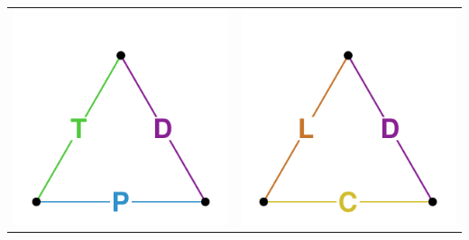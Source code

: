 \documentclass[20pt]{beamer}
\begin{document}
\begin{frame}
\begin{center}
\begin{tabular}{c c}
     \includegraphics[scale=.8]{Figures/TPDid.pdf} &
     \includegraphics[scale=.8]{Figures/LCDid.pdf}    
\end{tabular}
\end{center}
\end{frame}
\end{document}
